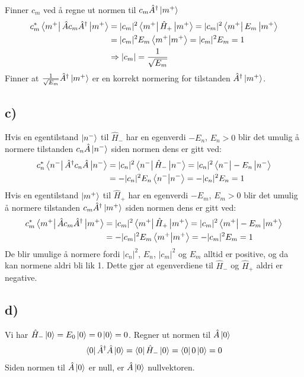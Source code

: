 \documentclass[norsk,a4paper,12pt]{article}
\begin{document}
Finner $c_m$ ved å regne ut normen til $c_m \hat{A}^\dagger \ket{m^+}$
\begin{equation}
\begin{aligned}
	c_m^* \bra{m^+} \hat{A} c_m \hat{A}^\dagger \ket{m^+} &= |c_m|^2 \bra{m^+} \hat{H}_+ \ket{m^+} = |c_m|^2 \bra{m^+} E_m \ket{m^+} \\
	&= |c_m|^2 E_m \bra{m^+}\ket{m^+} = |c_m|^2 E_m = 1 \\
	&\Rightarrow |c_m| = \frac{1}{\sqrt{E_m}}
\end{aligned}
\end{equation}
Finner at $\frac{1}{\sqrt{E_m}} \hat{A}^\dagger \ket{m^+}$ er en korrekt normering for tilstanden $\hat{A}^\dagger \ket{m^+}$.

\subsection*{c)}
Hvis en egentilstand $\ket{n^-}$ til $\hat{H}_-$ har en egenverdi $-E_n$, $E_n > 0$ blir det umulig å normere tilstanden $c_n \hat{A} \ket{n^-}$ siden normen dens er gitt ved:
\begin{equation}
\begin{aligned}
	c_n^* \bra{n^-} \hat{A}^\dagger c_n \hat{A} \ket{n^-} &= |c_n|^2 \bra{n^-} \hat{H}_- \ket{n^-} = |c_n|^2 \bra{n^-} -E_n \ket{n^-} \\
	&= -|c_n|^2 E_n \bra{n^-}\ket{n^-} = -|c_n|^2 E_n = 1
\end{aligned}
\end{equation}
Hvis en egentilstand $\ket{m^+}$ til $\hat{H}_+$ har en egenverdi $-E_m$, $E_m > 0$ blir det umulig å normere tilstanden $c_m \hat{A}^\dagger \ket{m^+}$ siden normen dens er gitt ved:
\begin{equation}
\begin{aligned}
	c_m^* \bra{m^+} \hat{A} c_m \hat{A}^\dagger \ket{m^+} &= |c_m|^2 \bra{m^+} \hat{H}_+ \ket{m^+} = |c_m|^2 \bra{m^+} -E_m \ket{m^+} \\
	&= -|c_m|^2 E_m \bra{m^+}\ket{m^+} = -|c_m|^2 E_m = 1
\end{aligned}
\end{equation}
De blir umulige å normere fordi $|c_n|^2$, $E_n$, $|c_m|^2$ og $E_m$ alltid er positive, og da kan normene aldri bli lik 1. Dette gjør at egenverdiene til $\hat{H}_-$ og $\hat{H}_+$ aldri er negative.

\subsection*{d)}
Vi har $\hat{H}_- \ket{0} = E_0 \ket{0} = 0 \ket{0} = 0$. Regner ut normen til $\hat{A} \ket{0}$
\begin{equation}
\begin{aligned}
\bra{0} \hat{A}^\dagger \hat{A} \ket{0} = \bra{0} \hat{H}_- \ket{0} = \bra{0} 0 \ket{0} = 0
\end{aligned}
\end{equation}
Siden normen til $\hat{A} \ket{0}$ er null, er $\hat{A} \ket{0}$ nullvektoren.
\end{document}
